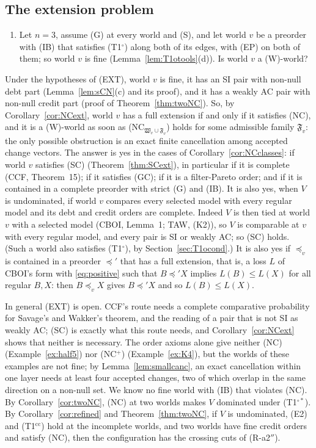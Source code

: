 \documentclass[11pt]{article}
\theoremstyle{definition}\newtheorem{definition}[theorem]{Definition}
\theoremstyle{remark}\newtheorem{remark}[theorem]{Remark}
\newcommand{\To}{\textup{(T1$^\circ$)}}
\newcommand{\Tos}{\textup{(T1$^{\circ*}$)}}
\newcommand{\Tcc}{\textup{(T1$^{\mathrm{cc}}$)}}
\begin{document}
\subsection{The extension problem}\label{sec:EXT}

\begin{enumerate}[label=(EXT),leftmargin=*]
\item Let $n=3$, assume (G) at every world and (S), and let world $v$ be a
preorder with (IB) that satisfies \To{} along both of its edges, with (EP)
on both of them; so world $v$ is fine (Lemma~\ref{lem:T1otools}(d)). Is
world $v$ a (W)-world?
\end{enumerate}
Under the hypotheses of (EXT), world $v$ is fine, it has an SI pair with
non-null debt part (Lemma~\ref{lem:sCN}(c) and its proof), and it has a
weakly AC pair with non-null credit part (proof of
Theorem~\ref{thm:twoNC}). So, by Corollary~\ref{cor:NCext}, world $v$ has a
full extension if and only if it satisfies (NC), and it is a (W)-world as
soon as (NC$_{\mathfrak W_v\cup\mathfrak F_v}$) holds for some admissible
family $\mathfrak F_v$: the only possible obstruction is an exact finite
cancellation among accepted change vectors. The answer is yes in the cases
of Corollary~\ref{cor:NCclasses}: if world $v$ satisfies (SC)
(Theorem~\ref{thm:SCext}), in particular if it is complete (CCF,
Theorem~15); if it satisfies (GC); if it is a filter-Pareto order; and if it
is contained in a complete preorder with strict (G) and (IB). It is also
yes, when $V$ is
undominated, if world $v$ compares every selected model with every regular
model and its debt and credit orders are complete. Indeed $V$ is then tied
at world $v$ with a selected model (CBOI, Lemma~1; TAW, (K2)), so $V$ is
comparable at $v$ with every regular model, and every pair is SI or weakly
AC; so (SC) holds. (Such a world also satisfies \To, by
Section~\ref{sec:T1ocond}.) It is also yes if
$\preceq_v$ is contained in a preorder $\preceq'$ that has a full extension,
that is, a loss $L$ of CBOI's form with \eqref{eq:positive} such that
$B\preceq'X$ implies $L(B)\le L(X)$ for all regular $B,X$: then
$B\preceq_vX$ gives $B\preceq'X$ and so $L(B)\le L(X)$.

In general (EXT) is open. CCF's route needs a complete comparative
probability for Savage's and Wakker's theorem, and the reading of a pair
that is not SI as weakly AC; (SC) is exactly what this route needs, and
Corollary~\ref{cor:NCext} shows that neither is necessary. The order axioms
alone give neither (NC) (Example~\ref{ex:half5}) nor (NC$^+$)
(Example~\ref{ex:K4}), but the worlds of these examples are not fine; by Lemma~\ref{lem:smallcanc}, an exact cancellation
within one layer needs at least four accepted changes, two of which overlap
in the same direction on a non-null set. We know no fine world with (IB)
that violates (NC). By Corollary~\ref{cor:twoNC}, (NC) at two worlds makes
$V$ dominated under \Tos. By Corollary~\ref{cor:refined} and
Theorem~\ref{thm:twoNC}, if $V$ is undominated, (E2) and \Tcc{} hold at the
incomplete worlds, and two worlds have fine credit orders and satisfy (NC),
then the configuration has the crossing cuts of (R-a2$''$).
\end{document}

